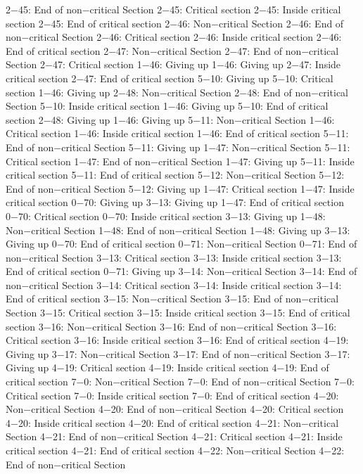 2−45: End of non−critical Section
2−45: Critical section
2−45: Inside critical section
2−45: End of critical section
2−46: Non−critical Section
2−46: End of non−critical Section
2−46: Critical section
2−46: Inside critical section
2−46: End of critical section
2−47: Non−critical Section
2−47: End of non−critical Section
2−47: Critical section
1−46: Giving up
1−46: Giving up
2−47: Inside critical section
2−47: End of critical section
5−10: Giving up
5−10: Critical section
1−46: Giving up
2−48: Non−critical Section
2−48: End of non−critical Section
5−10: Inside critical section
1−46: Giving up
5−10: End of critical section
2−48: Giving up
1−46: Giving up
5−11: Non−critical Section
1−46: Critical section
1−46: Inside critical section
1−46: End of critical section
5−11: End of non−critical Section
5−11: Giving up
1−47: Non−critical Section
5−11: Critical section
1−47: End of non−critical Section
1−47: Giving up
5−11: Inside critical section
5−11: End of critical section
5−12: Non−critical Section
5−12: End of non−critical Section
5−12: Giving up
1−47: Critical section
1−47: Inside critical section
0−70: Giving up
3−13: Giving up
1−47: End of critical section
0−70: Critical section
0−70: Inside critical section
3−13: Giving up
1−48: Non−critical Section
1−48: End of non−critical Section
1−48: Giving up
3−13: Giving up
0−70: End of critical section
0−71: Non−critical Section
0−71: End of non−critical Section
3−13: Critical section
3−13: Inside critical section
3−13: End of critical section
0−71: Giving up
3−14: Non−critical Section
3−14: End of non−critical Section
3−14: Critical section
3−14: Inside critical section
3−14: End of critical section
3−15: Non−critical Section
3−15: End of non−critical Section
3−15: Critical section
3−15: Inside critical section
3−15: End of critical section
3−16: Non−critical Section
3−16: End of non−critical Section
3−16: Critical section
3−16: Inside critical section
3−16: End of critical section
4−19: Giving up
3−17: Non−critical Section
3−17: End of non−critical Section
3−17: Giving up
4−19: Critical section
4−19: Inside critical section
4−19: End of critical section
7−0: Non−critical Section
7−0: End of non−critical Section
7−0: Critical section
7−0: Inside critical section
7−0: End of critical section
4−20: Non−critical Section
4−20: End of non−critical Section
4−20: Critical section
4−20: Inside critical section
4−20: End of critical section
4−21: Non−critical Section
4−21: End of non−critical Section
4−21: Critical section
4−21: Inside critical section
4−21: End of critical section
4−22: Non−critical Section
4−22: End of non−critical Section
